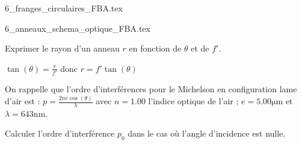 \begin{center}
	{6_franges_circulaires_FBA.tex}
\end{center}

                                \initialisationPartieDroite %
\begin{center}
	{6_anneaux_schema_optique_FBA.tex}
\end{center}
                               \finalisationDuPartageDePage %


\debutEntrainement



\begin{enonce}
Exprimer le rayon d'un anneau $r$ en fonction de $\theta$ et de $f'$.
\end{enonce}


\begin{corrige}
	$\tan(\theta)=\frac{r}{f'}$ donc $r=f' \tan(\theta)$
\end{corrige}



\begin{enonce}
On rappelle que l'ordre d'interférences pour le Michelson en configuration lame d'air est : $p=\frac{2ne \cos(\theta)}{\lambda}$ 
avec $n=\num{1.00}$ l'indice optique de l'air ; $e=\num{5.00}\si{\micro\metre}$ et $\lambda=\num{643}\si{\nano\metre}$.

Calculer l'ordre d'interférence $p_0$ dans le cas où l'angle d'incidence est nulle.
\end{enonce}
	
